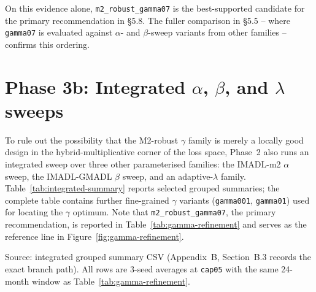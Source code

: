 On this evidence alone, \texttt{m2\_robust\_gamma07} is the best-supported candidate for the primary recommendation in \S5.8. The fuller comparison in \S5.5 -- where \texttt{gamma07} is evaluated against $\alpha$- and $\beta$-sweep variants from other families -- confirms this ordering.

\clearpage
\section{Phase 3b: Integrated $\alpha$, $\beta$, and $\lambda$ sweeps}

\label{sec:phase3b-integrated-sweeps}

To rule out the possibility that the M2-robust $\gamma$ family is merely a locally good design in the hybrid-multiplicative corner of the loss space, Phase~2 also runs an integrated sweep over three other parameterised families: the IMADL-m2 $\alpha$ sweep, the IMADL-GMADL $\beta$ sweep, and an adaptive-$\lambda$ family. Table~\ref{tab:integrated-summary} reports selected grouped summaries; the complete table contains further fine-grained $\gamma$ variants (\texttt{gamma001}, \texttt{gamma01}) used for locating the $\gamma$ optimum. Note that \texttt{m2\_robust\_gamma07}, the primary recommendation, is reported in Table~\ref{tab:gamma-refinement} and serves as the reference line in Figure~\ref{fig:gamma-refinement}.

Source: integrated grouped summary CSV (Appendix~B, Section~B.3 records the exact branch path). All rows are 3-seed averages at \texttt{cap05} with the same 24-month window as Table~\ref{tab:gamma-refinement}.

